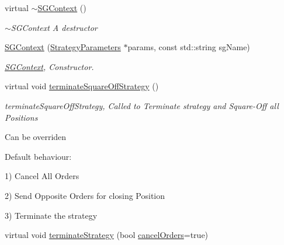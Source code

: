 \begin{DoxyCompactItemize}
\item 
\hypertarget{class_a_p_i2_1_1_s_g_context_a4d2ddbdd3e8a4a96ad52b90a1c0ef33e}{virtual \hyperlink{class_a_p_i2_1_1_s_g_context_a4d2ddbdd3e8a4a96ad52b90a1c0ef33e}{$\sim$\-S\-G\-Context} ()}\label{class_a_p_i2_1_1_s_g_context_a4d2ddbdd3e8a4a96ad52b90a1c0ef33e}

\begin{DoxyCompactList}\small\item\em $\sim$\-S\-G\-Context A destructor \end{DoxyCompactList}\item 
\hyperlink{class_a_p_i2_1_1_s_g_context_aebf22dc8466ec0f3d31e7993a3f5540d}{S\-G\-Context} (\hyperlink{class_a_p_i2_1_1_strategy_parameters}{Strategy\-Parameters} $\ast$params, const std\-::string sg\-Name)
\begin{DoxyCompactList}\small\item\em \hyperlink{class_a_p_i2_1_1_s_g_context}{S\-G\-Context}, Constructor. \end{DoxyCompactList}\item 
\hypertarget{class_a_p_i2_1_1_s_g_context_a01c0a9513e75bf9230c714ccbe03ce46}{virtual void \hyperlink{class_a_p_i2_1_1_s_g_context_a01c0a9513e75bf9230c714ccbe03ce46}{terminate\-Square\-Off\-Strategy} ()}\label{class_a_p_i2_1_1_s_g_context_a01c0a9513e75bf9230c714ccbe03ce46}

\begin{DoxyCompactList}\small\item\em terminate\-Square\-Off\-Strategy, Called to Terminate strategy and Square-\/\-Off all Positions\par
 Can be overriden \par
 Default behaviour\-: \par
 1) Cancel All Orders \par
 2) Send Opposite Orders for closing Position \par
 3) Terminate the strategy \par
 \end{DoxyCompactList}\item 
\hypertarget{class_a_p_i2_1_1_s_g_context_a1958accbe8625d491878add4bf5533d2}{virtual void \hyperlink{class_a_p_i2_1_1_s_g_context_a1958accbe8625d491878add4bf5533d2}{terminate\-Strategy} (bool \hyperlink{class_a_p_i2_1_1_s_g_context_a639ea0f4f942043c2dbf3992d4fd8a96}{cancel\-Orders}=true)}\label{class_a_p_i2_1_1_s_g_context_a1958accbe8625d491878add4bf5533d2}


\end{DoxyCompactItemize}
